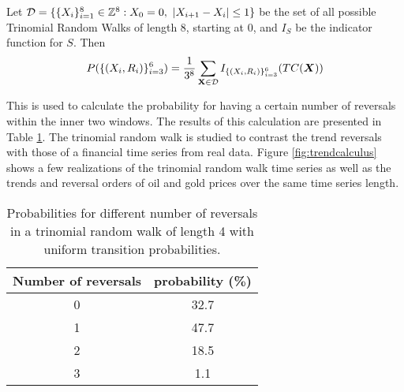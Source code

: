 \documentclass[../trend-calculus.tex]{subfiles}
\begin{document}
  Let $\mathcal{D} = \{ \{X_i\}_{i=1}^8 \in \mathbb{Z}^8 : X_0 = 0,\ |X_{i+1} - X_i| \le 1 \}$ be 
  the set of all possible Trinomial Random Walks of length 8, starting at 0, and 
  $I_S$ be the indicator function for $S$.
  Then 
  \[ 
    P( \{ (X_i, R_i) \}_{i=3}^6 ) = 
      \frac{1}{3^8} \sum_{\textbf{X} \in \mathcal{D}} 
        I_{ \{ (X_i, R_i) \}_{i=3}^6 } (TC(\X)) 
  \]

  This is used to calculate the probability for
  having a certain number of reversals within the inner two windows.
  The results of this calculation are presented in Table \ref{tab:tc-showcase}.
  The trinomial random walk is studied to contrast the trend reversals with those of
  a financial time series from real data.
  Figure \ref{fig:trendcalculus} shows a few realizations of
  the trinomial random walk time series as well as the trends
  and reversal orders of oil and gold prices over the same time series length.

  \begin{table}
    \centering
    \begin{tabular}{|c|c|}
      \hline
      Number of reversals & probability (\%) \\
      \hline
      0 & 32.7 \\
      1 & 47.7 \\
      2 & 18.5 \\
      3 & 1.1 \\
      \hline
    \end{tabular}
    \caption{
      Probabilities for different number of reversals in a
      trinomial random walk of length 4 with uniform transition probabilities.
    }
    \label{tab:tc-showcase}
  \end{table}
\end{document}
